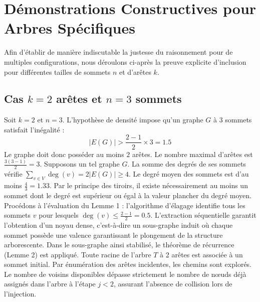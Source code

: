 \documentclass[12pt,a4paper]{article}
\begin{document}
\section{Démonstrations Constructives pour Arbres Spécifiques}

Afin d'établir de manière indiscutable la justesse du raisonnement pour de multiples configurations, nous déroulons ci-après la preuve explicite d'inclusion pour différentes tailles de sommets $n$ et d'arêtes $k$.

\subsection{Cas $k = 2$ arêtes et $n = 3$ sommets}
Soit $k = 2$ et $n = 3$. L'hypothèse de densité impose qu'un graphe $G$ à 3 sommets satisfait l'inégalité :
$$ |E(G)| > \frac{2-1}{2} \times 3 = 1.5 $$
Le graphe doit donc posséder au moins $2$ arêtes. Le nombre maximal d'arêtes est $\frac{3(3-1)}{2} = 3$.
Supposons un tel graphe $G$. La somme des degrés de ses sommets vérifie $\sum_{v \in V} \deg(v) = 2|E(G)| \geq 4$.
Le degré moyen des sommets est d'au moins $\frac{4}{3} = 1.33$.
Par le principe des tiroirs, il existe nécessairement au moins un sommet dont le degré est supérieur ou égal à la valeur plancher du degré moyen.
Procédons à l'évaluation du Lemme 1 : l'algorithme d'élagage identifie tous les sommets $v$ pour lesquels $\deg(v) \leq \frac{2-1}{2} = 0.5$.
L'extraction séquentielle garantit l'obtention d'un noyau dense, c'est-à-dire un sous-graphe induit où chaque sommet possède une valence garantissant le plongement de la structure arborescente.
Dans le sous-graphe ainsi stabilisé, le théorème de récurrence (Lemme 2) est appliqué. Toute racine de l'arbre $T$ à 2 arêtes est associée à un sommet initial. Par énumération des arêtes incidentes, les chemins sont explorés. Le nombre de voisins disponibles dépasse strictement le nombre de nœuds déjà assignés dans l'arbre à l'étape $j < 2$, assurant l'absence de collision lors de l'injection.
\end{document}
